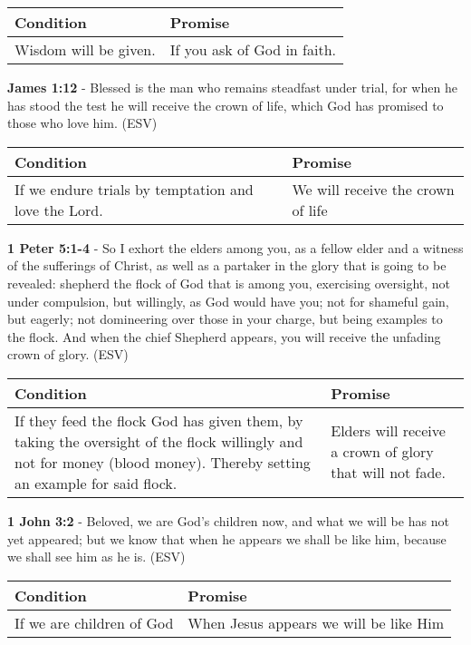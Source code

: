 \documentclass[11pt]{article}
\begin{document}
\begin{center}
\begin{tabular}{ll}
Condition & Promise\\[0pt]
\hline
Wisdom will be given. & If you ask of God in faith.\\[0pt]
\end{tabular}
\end{center}

\textbf{James 1:12} - Blessed is the man who remains steadfast under trial, for when he has stood the test he will receive the crown of life, which God has promised to those who love him. (ESV)

\begin{center}
\begin{tabular}{ll}
Condition & Promise\\[0pt]
\hline
If we endure trials by temptation and love the Lord. & We will receive the crown of life\\[0pt]
\end{tabular}
\end{center}

\textbf{1 Peter 5:1-4} - So I exhort the elders among you, as a fellow elder and a witness of the sufferings of Christ, as well as a partaker in the glory that is going to be revealed: shepherd the flock of God that is among you, exercising oversight, not under compulsion, but willingly, as God would have you; not for shameful gain, but eagerly; not domineering over those in your charge, but being examples to the flock. And when the chief Shepherd appears, you will receive the unfading crown of glory. (ESV)

\begin{center}
\begin{tabular}{ll}
Condition & Promise\\[0pt]
\hline
If they feed the flock God has given them, by taking the oversight of the flock willingly and not for money (blood money). Thereby setting an example for said flock. & Elders will receive a crown of glory that will not fade.\\[0pt]
\end{tabular}
\end{center}

\textbf{1 John 3:2} - Beloved, we are God's children now, and what we will be has not yet appeared; but we know that when he appears we shall be like him, because we shall see him as he is. (ESV)

\begin{center}
\begin{tabular}{ll}
Condition & Promise\\[0pt]
\hline
If we are children of God & When Jesus appears we will be like Him\\[0pt]
\end{tabular}
\end{center}
\end{document}
